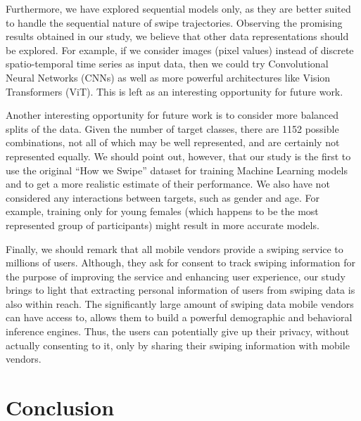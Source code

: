 \documentclass[sn-mathphys, pdflatex]{sn-jnl}
\newcommand{\rev}[1]{#1}
\begin{document}
Furthermore, we have explored sequential models only,
as they are better suited to handle the sequential nature of \rev{swipe} trajectories.
Observing the promising results obtained in our study, we believe that other data representations should be explored.
For example, if we consider images (pixel values) instead of discrete spatio-temporal time series as input data,
then we could try Convolutional Neural Networks (CNNs) as well as more powerful architectures like Vision Transformers (ViT).
This is left as an interesting opportunity for future work.

\rev{
Another interesting opportunity for future work is to consider more balanced splits of the data.
Given the number of target classes, there are 1152 possible combinations,
not all of which may be well represented, and are certainly not represented equally.
We should point out, however, that our study is the first to use the original ``How we Swipe'' dataset
for training Machine Learning models and to get a more realistic estimate of their performance.
We also have not considered any interactions between targets, such as gender and age.
For example, training only for young females (which happens to be the most represented group of participants)
might result in more accurate models.
}

Finally, we should remark that all mobile vendors provide a swiping service to millions of users.
Although, they ask for consent to track swiping information for the purpose of improving the service and enhancing user experience,
our study brings to light that extracting personal information of users from swiping data is also within reach.
The significantly large amount of swiping data mobile vendors can have access to,
allows them to build a powerful demographic and behavioral inference engines.
Thus, the users can potentially give up their privacy, without actually consenting to it,
only by sharing their swiping information with mobile vendors.


\section{Conclusion}
\label{sec:conclusion}
\end{document}
